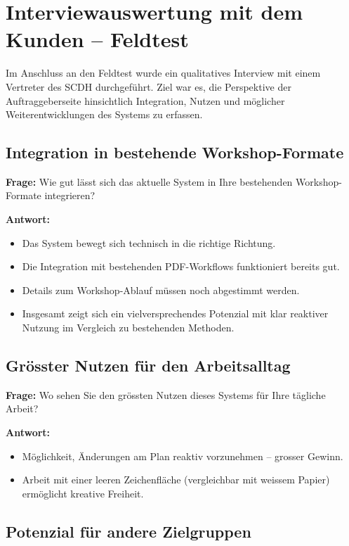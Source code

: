 \section{Interviewauswertung mit dem Kunden – Feldtest}

Im Anschluss an den Feldtest wurde ein qualitatives Interview mit einem Vertreter des SCDH durchgeführt. Ziel war es, die Perspektive der Auftraggeberseite hinsichtlich Integration, Nutzen und möglicher Weiterentwicklungen des Systems zu erfassen.

\subsection{Integration in bestehende Workshop-Formate}

\textbf{Frage:} Wie gut lässt sich das aktuelle System in Ihre bestehenden Workshop-Formate integrieren?

\textbf{Antwort:}
\begin{itemize}
    \item Das System bewegt sich technisch in die richtige Richtung.
    \item Die Integration mit bestehenden PDF-Workflows funktioniert bereits gut.
    \item Details zum Workshop-Ablauf müssen noch abgestimmt werden.
    \item Insgesamt zeigt sich ein vielversprechendes Potenzial mit klar reaktiver Nutzung im Vergleich zu bestehenden Methoden.
\end{itemize}

\subsection{Grösster Nutzen für den Arbeitsalltag}

\textbf{Frage:} Wo sehen Sie den grössten Nutzen dieses Systems für Ihre tägliche Arbeit?

\textbf{Antwort:}
\begin{itemize}
    \item Möglichkeit, Änderungen am Plan reaktiv vorzunehmen – grosser Gewinn.
    \item Arbeit mit einer leeren Zeichenfläche (vergleichbar mit weissem Papier) ermöglicht kreative Freiheit.
\end{itemize}

\subsection{Potenzial für andere Zielgruppen}

